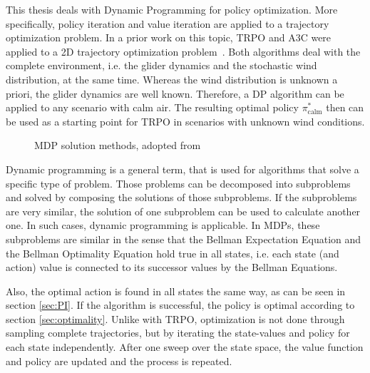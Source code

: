 This thesis deals with Dynamic Programming for policy optimization. More specifically, policy iteration and value iteration are applied to a trajectory optimization problem. In a prior work on this topic, TRPO and A3C were applied to a 2D trajectory optimization problem~\cite{Zuern2017}. Both algorithms deal with the complete environment, i.e. the glider dynamics and the stochastic wind distribution, at the same time. Whereas the wind distribution is unknown a priori, the glider dynamics are well known. Therefore, a DP algorithm can be applied to any scenario with calm air. The resulting optimal policy $\pi^*_{\text{calm}}$ then can be used as a starting point for TRPO in scenarios with unknown wind conditions.
\begin{figure}[h]
	\centering
	\caption{MDP solution methods, adopted from~\cite{Schulman2016}}
	\label{fig:RLmethods} 
\end{figure}

Dynamic programming is a general term, that is used for algorithms that solve a specific type of problem. Those problems can be decomposed into subproblems and solved by composing the solutions of those subproblems. If the subproblems are very similar, the solution of one subproblem can be used to calculate another one. In such cases, dynamic programming is applicable. In MDPs, these subproblems are similar in the sense that the Bellman Expectation Equation and the Bellman Optimality Equation hold true in all states, i.e. each state (and action) value is connected to its successor values by the Bellman Equations.

Also, the optimal action is found in all states the same way, as can be seen in section \ref{sec:PI}. If the algorithm is successful, the policy is optimal according to section \ref{sec:optimality}. Unlike with TRPO, optimization is not done through sampling complete trajectories, but by iterating the state-values and policy for each state independently. After one sweep over the state space, the value function and policy are updated and the process is repeated.\smallbreak

